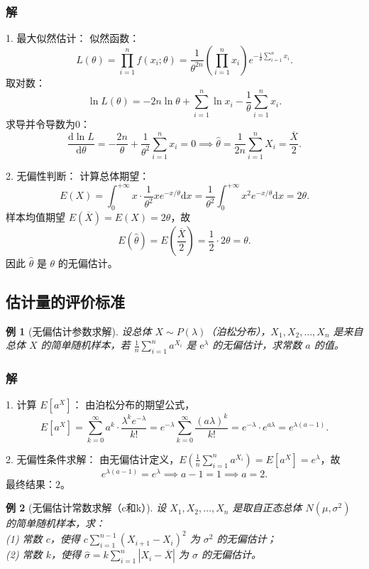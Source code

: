 \documentclass[11pt,a4paper,oneside,openany]{book}
\theoremstyle{yhbthm}
\newtheorem{example}{例}[section]
\begin{document}
\subsubsection{解}
1. 最大似然估计：
似然函数：
\[
L(\theta) = \prod_{i=1}^n f(x_i;\theta) = \frac{1}{\theta^{2n}} \left(\prod_{i=1}^n x_i\right) e^{-\frac{1}{\theta}\sum_{i=1}^n x_i}.
\]
取对数：
\[
\ln L(\theta) = -2n\ln\theta + \sum_{i=1}^n \ln x_i - \frac{1}{\theta} \sum_{i=1}^n x_i.
\]
求导并令导数为0：
\[
\frac{\mathrm{d}\ln L}{\mathrm{d}\theta} = -\frac{2n}{\theta} + \frac{1}{\theta^2} \sum_{i=1}^n x_i = 0 \implies \hat\theta = \frac{1}{2n} \sum_{i=1}^n X_i = \frac{\overline{X}}{2}.
\]

2. 无偏性判断：
计算总体期望：
\[
E(X) = \int_{0}^{+\infty} x \cdot \frac{1}{\theta^2} x e^{-x/\theta} \mathrm{d}x = \frac{1}{\theta^2} \int_{0}^{+\infty} x^2 e^{-x/\theta} \mathrm{d}x = 2\theta.
\]
样本均值期望 $E(\overline{X}) = E(X) = 2\theta$，故
\[
E(\hat\theta) = E\left(\frac{\overline{X}}{2}\right) = \frac{1}{2} \cdot 2\theta = \theta.
\]
因此 $\hat\theta$ 是 $\theta$ 的无偏估计。

\subsection{估计量的评价标准}

\begin{example}[无偏估计参数求解]
设总体 $X \sim P(\lambda)$（泊松分布），$X_1,X_2,\dots,X_n$ 是来自总体 $X$ 的简单随机样本，若 $\frac{1}{n}\sum_{i=1}^n a^{X_i}$ 是 $\mathrm{e}^{\lambda}$ 的无偏估计，求常数 $a$ 的值。
\end{example}

\subsubsection{解}
1. 计算 $E[a^X]$：
由泊松分布的期望公式，
\[
E[a^X] = \sum_{k=0}^{\infty} a^k \cdot \frac{\lambda^k e^{-\lambda}}{k!} = e^{-\lambda} \sum_{k=0}^{\infty} \frac{(a\lambda)^k}{k!} = e^{-\lambda} \cdot e^{a\lambda} = e^{\lambda(a-1)}.
\]

2. 无偏性条件求解：
由无偏估计定义，$E\left(\frac{1}{n}\sum_{i=1}^n a^{X_i}\right) = E[a^X] = e^{\lambda}$，故
\[
e^{\lambda(a-1)} = e^{\lambda} \implies a-1 = 1 \implies a = 2.
\]
最终结果：$\boxed{2}$。

\begin{example}[无偏估计常数求解（c和k）]
设 $X_1,X_2,\dots,X_n$ 是取自正态总体 $N(\mu,\sigma^2)$ 的简单随机样本，求：\\
(1) 常数 $c$，使得 $c\sum_{i=1}^{n-1} (X_{i+1}-X_i)^2$ 为 $\sigma^2$ 的无偏估计；\\
(2) 常数 $k$，使得 $\hat{\sigma} = k\sum_{i=1}^n |X_i - \overline{X}|$ 为 $\sigma$ 的无偏估计。
\end{example}
\end{document}
